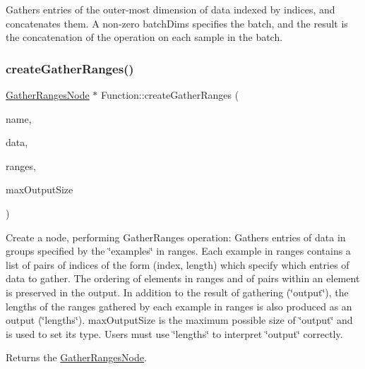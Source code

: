 Gathers entries of the outer-\/most dimension of {\ttfamily data} indexed by {\ttfamily indices}, and concatenates them. A non-\/zero {\ttfamily batch\+Dims} specifies the batch, and the result is the concatenation of the operation on each sample in the batch. \mbox{\label{classglow_1_1_function_aff08f2044b5486dc1df39158fd333ceb}} 
\subsubsection{\texorpdfstring{create\+Gather\+Ranges()}{createGatherRanges()}}
{\footnotesize\ttfamily \hyperlink{classglow_1_1_gather_ranges_node}{Gather\+Ranges\+Node} $\ast$ Function\+::create\+Gather\+Ranges (\begin{DoxyParamCaption}\item[{llvm\+::\+String\+Ref}]{name,  }\item[{\hyperlink{structglow_1_1_node_value}{Node\+Value}}]{data,  }\item[{\hyperlink{structglow_1_1_node_value}{Node\+Value}}]{ranges,  }\item[{\hyperlink{namespaceglow_a0ca574644e1e42ef193a9947fb4d8911}{unsigned\+\_\+t}}]{max\+Output\+Size }\end{DoxyParamCaption})}

Create a node, performing Gather\+Ranges operation\+: Gathers entries of {\ttfamily data} in groups specified by the \char`\"{}examples\char`\"{} in {\ttfamily ranges}. Each example in {\ttfamily ranges} contains a list of pairs of indices of the form (index, length) which specify which entries of {\ttfamily data} to gather. The ordering of elements in {\ttfamily ranges} and of pairs within an element is preserved in the output. In addition to the result of gathering (\char`\"{}output\char`\"{}), the lengths of the ranges gathered by each example in {\ttfamily ranges} is also produced as an output (\char`\"{}lengths\char`\"{}). {\ttfamily max\+Output\+Size} is the maximum possible size of \char`\"{}output\char`\"{} and is used to set its type. Users must use \char`\"{}lengths\char`\"{} to interpret \char`\"{}output\char`\"{} correctly. \begin{DoxyReturn}{Returns}
the \hyperlink{classglow_1_1_gather_ranges_node}{Gather\+Ranges\+Node}. 
\end{DoxyReturn}
\mbox{\label{classglow_1_1_function_a38073ffa1c63421716ee236d56178738}} 
